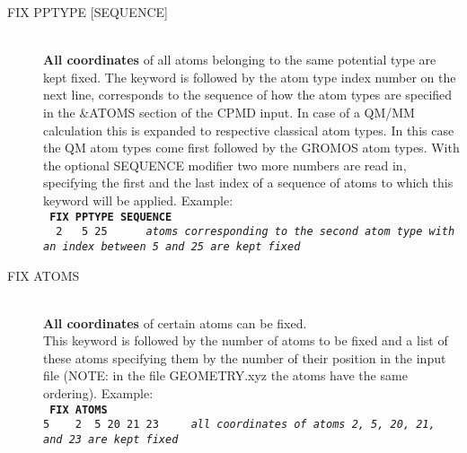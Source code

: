 \documentclass[twoside,10pt,titlepage,a4paper]{article}
\begin{document}
\begin{description}
        \item[FIX PPTYPE {[SEQUENCE]}] \hfill \\
          \textbf{All coordinates} of all atoms belonging to the same
          potential type are kept fixed. The keyword is followed by the
          atom type index number on the next line, corresponds to the
          sequence of how the atom types are specified in the \&ATOMS
          section of the CPMD input. In case of a QM/MM calculation
          this is expanded to respective classical atom types. In this
          case the QM atom types come first followed by the GROMOS atom
          types.
          With the optional SEQUENCE modifier
          two more numbers are read in, specifying the first and the
          last index of a sequence of atoms to which this keyword will
          be applied.
          Example: \\
          {\tt
            {\bf FIX PPTYPE SEQUENCE}\\
            ~~2~~~5~25~~~~~~{\small \sl atoms corresponding to the
              second atom type with an index between 5 and 25 are kept fixed}
            }

        \item[FIX ATOMS]\hfill \\
          {\bf All coordinates} of certain atoms can be fixed.\\
          This keyword is followed by the number of atoms to be fixed
          and a list of these atoms specifying them by the number of
          their position in the input file (NOTE: in the file
          GEOMETRY.xyz the atoms have the same ordering).
          Example: \\
          {\tt
            {\bf FIX ATOMS  }\\
            5~~~~2~~5~20~21~23~~~~~{\small \sl all coordinates of atoms
              2, 5, 20, 21, and 23 are kept fixed}
            }


\end{description}
\end{document}
